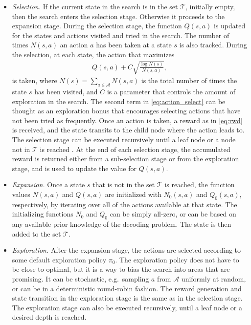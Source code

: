 \documentclass[conference,letterpaper]{IEEEtran}
\begin{document}
\begin{itemize}[leftmargin=*]%
	\item
	\emph{Selection.}
	If the current state in the search is in the set $\mathcal T$, initially empty, then the search enters the selection stage.
	Otherwise it proceeds to the expansion stage. 
	During the selection stage, the function $Q(s,a)$ is updated for the states and actions visited and tried in the search. 
	The number of times $N(s,a)$ an action $a$ has been taken at a state $s$ is also tracked.
	During the selection, at each state, the action that maximizes 
	\begin{align}\label{eq:action_select}
		Q(s,a) + C \sqrt{\frac{\log N(s)}{N(s,a)}} ,
	\end{align}
	is taken, where $N(s) = \sum_{a\in\mathcal A} N(s,a)$ is the total number of times the state $s$ has been visited, and $C$ is a parameter that controls the amount of exploration in the search.
	The second term in \eqref{eq:action_select} can be thought as an {exploration bonus} that encourages selecting actions that have not been tried as frequently.
	Once an action is taken, a reward as in \eqref{eq:rwd} is received, and the state transits to the child node where the action leads to.
	The selection stage can be executed recursively until a leaf node or a node not in $\mathcal T$ is reached \cite{adp_samp_mdp,dmuu05}.
	At the end of each selection stage, the accumulated reward is returned either from a sub-selection stage or from the exploration stage, and is used to update the value for $Q(s,a)$.			
	
	\smallskip
	\item
	\emph{Expansion.}
	Once a state $s$ that is not in the set $\mathcal T$ is reached, the function values $N(s,a)$ and $Q(s,a)$ are initialized with $N_0(s,a)$ and $Q_0(s,a)$, respectively, by iterating over all of the actions available at that state.
	The initializing functions $N_0$ and $Q_0$ can be simply all-zero, or can be based on any available prior knowledge of the decoding problem.
	The state is then added to the set $\mathcal T$.
	
	\smallskip
	\item
	\emph{Exploration.}
	After the expansion stage, the actions are selected according to some default exploration policy $\pi_0$.
	The exploration policy does not have to be close to optimal, but it is a way to bias the search into areas that are promising.
	It can be stochastic, e.g.\, sampling $a$ from $\mathcal{A}$ uniformly at random, or can be in a deterministic round-robin fashion.
	The reward generation and state transition in the exploration stage is the same as in the selection stage.
	The exploration stage can also be executed recursively, until a leaf node or a desired depth is reached.
	
\end{itemize}
\end{document}
